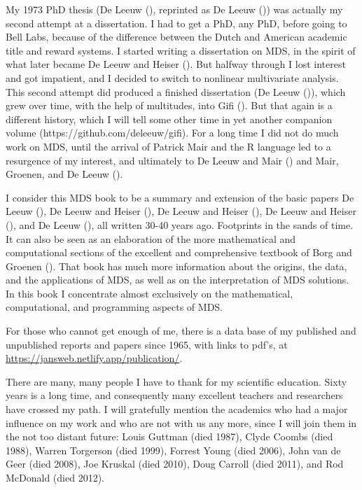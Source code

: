 \documentclass[
  12pt,
  letterpaper,
  DIV=11,
  numbers=noendperiod]{scrartcl}
\begin{document}
My 1973 PhD thesis (De Leeuw (),
reprinted as De Leeuw ()) was actually
my second attempt at a dissertation. I had to get a PhD, any PhD, before
going to Bell Labs, because of the difference between the Dutch and
American academic title and reward systems. I started writing a
dissertation on MDS, in the spirit of what later became De Leeuw and
Heiser (). But halfway through I
lost interest and got impatient, and I decided to switch to nonlinear
multivariate analysis. This second attempt did produced a finished
dissertation (De Leeuw ()), which grew
over time, with the help of multitudes, into Gifi
(). But that again is a different history,
which I will tell some other time in yet another companion volume
(https://github.com/deleeuw/gifi). For a long time I did not do much
work on MDS, until the arrival of Patrick Mair and the R language led to
a resurgence of my interest, and ultimately to De Leeuw and Mair
() and Mair, Groenen, and De
Leeuw ().

I consider this MDS book to be a summary and extension of the basic
papers De Leeuw (), De Leeuw and Heiser
(), De Leeuw and Heiser
(), De Leeuw and Heiser
(), and De Leeuw
(), all written 30-40 years ago.
Footprints in the sands of time. It can also be seen as an elaboration
of the more mathematical and computational sections of the excellent and
comprehensive textbook of Borg and Groenen
(). That book has much more
information about the origins, the data, and the applications of MDS, as
well as on the interpretation of MDS solutions. In this book I
concentrate almost exclusively on the mathematical, computational, and
programming aspects of MDS.

For those who cannot get enough of me, there is a data base of my
published and unpublished reports and papers since 1965, with links to
pdf's, at \url{https://jansweb.netlify.app/publication/}.

There are many, many people I have to thank for my scientific education.
Sixty years is a long time, and consequently many excellent teachers and
researchers have crossed my path. I will gratefully mention the
academics who had a major influence on my work and who are not with us
any more, since I will join them in the not too distant future: Louis
Guttman (died 1987), Clyde Coombs (died 1988), Warren Torgerson (died
1999), Forrest Young (died 2006), John van de Geer (died 2008), Joe
Kruskal (died 2010), Doug Carroll (died 2011), and Rod McDonald (died
2012).
\end{document}
